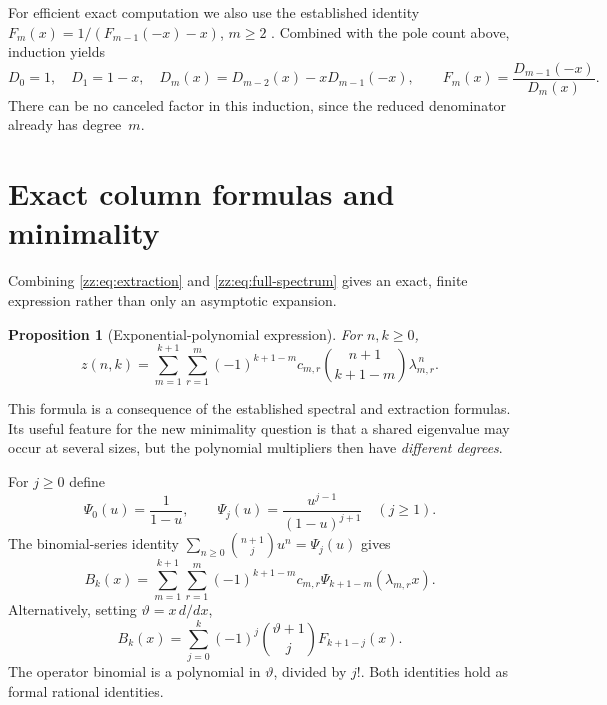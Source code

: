 \documentclass[11pt,a4paper]{article}
\newtheorem{proposition}[theorem]{Proposition}
\theoremstyle{definition}
\begin{document}
For efficient exact computation we also use the established identity
$F_m(x)=1/(F_{m-1}(-x)-x)$, $m\ge2$ \cite[Theorem~3.15]{pz}.
Combined with the pole count above, induction yields
\begin{equation}\label{zz:eq:D-recurrence}
 D_0=1,\quad D_1=1-x,\quad
 D_m(x)=D_{m-2}(x)-xD_{m-1}(-x),\qquad
 F_m(x)=\frac{D_{m-1}(-x)}{D_m(x)}.
\end{equation}
There can be no canceled factor in this induction, since the reduced
denominator already has degree~$m$.

\section{Exact column formulas and minimality}
\label{zz:sec:minimal}
Combining \eqref{zz:eq:extraction} and \eqref{zz:eq:full-spectrum} gives an exact,
finite expression rather than only an asymptotic expansion.
\begin{proposition}[Exponential-polynomial expression]
\label{zz:prop:exp-poly}
For $n,k\ge0$,
\begin{equation}\label{zz:eq:exp-poly}
 z(n,k)=\sum_{m=1}^{k+1}\sum_{r=1}^m
 (-1)^{k+1-m}c_{m,r}
 \binom{n+1}{k+1-m}\lambda_{m,r}^{\,n}.
\end{equation}
\end{proposition}
This formula is a consequence of the established spectral and extraction
formulas.  Its useful feature for the new minimality question is that a shared
eigenvalue may occur at several sizes, but the polynomial multipliers then
have \emph{different degrees}.

For $j\ge0$ define
\begin{equation}\label{zz:eq:Psi}
 \Psi_0(u)=\frac1{1-u},\qquad
 \Psi_j(u)=\frac{u^{j-1}}{(1-u)^{j+1}}\quad(j\ge1).
\end{equation}
The binomial-series identity
$\sum_{n\ge0}\binom{n+1}{j}u^n=\Psi_j(u)$ gives
\begin{equation}\label{zz:eq:B-explicit}
 B_k(x)=\sum_{m=1}^{k+1}\sum_{r=1}^m
 (-1)^{k+1-m}c_{m,r}\Psi_{k+1-m}(\lambda_{m,r}x).
\end{equation}
Alternatively, setting $\vartheta=x\,d/dx$,
\begin{equation}\label{zz:eq:B-differential}
 B_k(x)=\sum_{j=0}^k(-1)^j\binom{\vartheta+1}{j}F_{k+1-j}(x).
\end{equation}
The operator binomial is a polynomial in $\vartheta$, divided by $j!$.
Both identities hold as formal rational identities.
\end{document}
